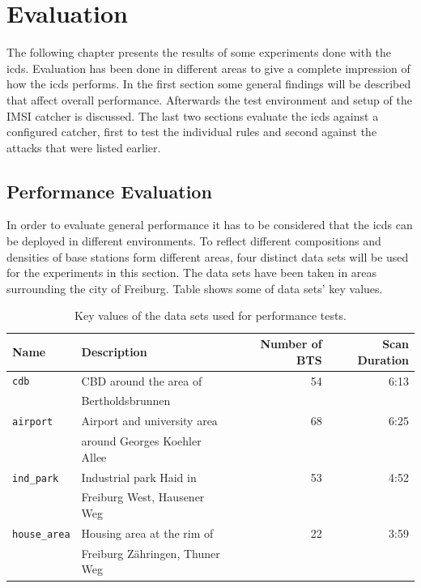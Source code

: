 \chapter{Evaluation}
The following chapter presents the results of some experiments done with the \gls{icds}.
Evaluation has been done in different areas to give a complete impression of how the \gls{icds} performs.
In the first section some general findings will be described that affect overall performance.
Afterwards the test environment and setup of the IMSI catcher is discussed.
The last two sections evaluate the \gls{icds} against a configured catcher, first to test the individual rules and second against the attacks that were listed earlier.

\section{Performance Evaluation}
In order to evaluate general performance it has to be considered that the \gls{icds} can be deployed in different environments.
To reflect different compositions and densities of base stations form different areas, four distinct data sets will be used for the experiments in this section.
The data sets have been taken in areas surrounding the city of Freiburg.
Table shows some of data sets' key values.

\begin{table}
\centering
\begin{tabular}{llrr}
\toprule
Name					&Description					&Number of BTS	&Scan Duration\\
\midrule
\texttt{cdb}			&CBD around the area of			&54				&6:13		\\
						&Bertholdsbrunnen				&				&			\\
\texttt{airport}		&Airport and university area	&68				&6:25		\\
						&around Georges Koehler Allee	&				&			\\
\texttt{ind\_park}		&Industrial park Haid in 		&53				&4:52		\\
						&Freiburg West,  Hausener Weg	&				&			\\
\texttt{house\_area}	&Housing area at the rim of 	&22				&3:59		\\
						&Freiburg Zähringen, Thuner Weg	&				&			\\
\bottomrule
\end{tabular}
\caption{Key values of the data sets used for performance tests.}
\label{tab:key_data}
\end{table}

